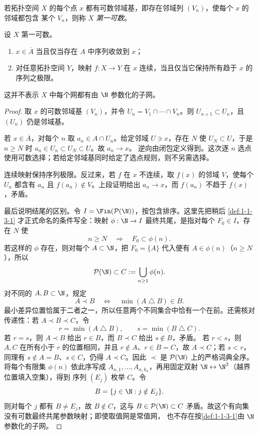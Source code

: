 \begin{definition}[第一可数]\label{def:1-1-1-first-countable}
若拓扑空间 \(X\) 的每个点 \(x\) 都有可数邻域基，即存在邻域列 \((V_n)\)，使每个 \(x\) 的邻域都包含
某个 \(V_n\)，则称 \(X\) \emph{第一可数}。
\end{definition}

\begin{proposition}[第一可数空间的序列检验]\label{proposition:1-1-1-first-countable-sequential-tests}
设 \(X\) 第一可数。
\begin{enumerate}
  \item \(x\in\overline A\) 当且仅当存在 \(A\) 中序列收敛到 \(x\)；
  \item 对任意拓扑空间 \(Y\)，映射 \(f:X\to Y\) 在 \(x\) 连续，当且仅当它保持所有趋于 \(x\) 的
  序列之极限。
\end{enumerate}
这并不表示 \(X\) 中每个网都有由 \(\N\) 参数化的子网。
\end{proposition}
\begin{proof}
取 \(x\) 的可数邻域基 \((V_n)\)，并令 \(U_n=V_1\cap\cdots\cap V_n\)。则
\(U_{n+1}\subset U_n\)，且 \((U_n)\) 仍是邻域基。

若 \(x\in\overline A\)，对每个 \(n\) 取 \(a_n\in A\cap U_n\)。给定邻域 \(U\ni x\)，存在 \(N\)
使 \(U_N\subset U\)，于是 \(n\ge N\) 时 \(a_n\in U_n\subset U_N\subset U\)。故 \(a_n\to x\)。
逆向由闭包定义得到。这次逐 \(n\) 选点使用可数选择；若给定邻域基同时给定了选点规则，则不另需选择。

连续映射保持序列极限。反过来，若 \(f\) 在 \(x\) 不连续，取 \(f(x)\) 的邻域 \(V\)，使每个 \(U_n\)
都含有 \(a_n\) 且 \(f(a_n)\notin V\)。上段证明给出 \(a_n\to x\)，而 \(f(a_n)\) 不趋于 \(f(x)\)，矛盾。

最后说明结尾的区别。令 \(I=\Fin(\mathcal P(\N))\)，按包含排序。这里先把稍后
\cref{def:1-1-3-1} 才正式命名的条件写全：映射 \(\phi:\N\to I\) 最终共尾，是指对每个
\(F_0\in I\)，存在 \(N\) 使
\[
  n\ge N\quad\Longrightarrow\quad F_0\subset\phi(n).
\]
若这样的 \(\phi\) 存在，则对每个 \(A\subset\N\)，把 \(F_0=\{A\}\) 代入便有
\(A\in\phi(n)\)（\(n\ge N\)），所以
\[
  \mathcal P(\N)\subset C:=\bigcup_{n\ge1}\phi(n).
\]
对不同的 \(A,B\subset\N\)，规定
\[
  A\prec B
  \quad\Longleftrightarrow\quad
  \min(A\mathbin\triangle B)\in B.
\]
最小差异位置恰属于二者之一，所以任意两个不同集合中恰有一个在前。还需核对传递性：若
\(A\prec B\prec C\)，令
\[
 r=\min(A\mathbin\triangle B),\qquad
 s=\min(B\mathbin\triangle C).
\]
若 \(r=s\)，则 \(A\prec B\) 给出 \(r\in B\)，而 \(B\prec C\) 给出 \(s\notin B\)，矛盾。
若 \(r<s\)，则 \(A,C\) 在所有小于 \(r\) 的位置相同，并且 \(r\notin A\)、\(r\in B=C\)，故
\(A\prec C\)；若 \(s<r\)，同理有 \(s\notin A=B\)、\(s\in C\)，仍得 \(A\prec C\)。因此
\(\prec\) 是 \(\mathcal P(\N)\) 上的严格词典全序。将每个有限集 \(\phi(n)\) 依此序写成
\(A_{n,1},\ldots,A_{n,k_n}\)，再用固定双射 \(\N\leftrightarrow\N^2\)（越界位置填入空集），得到
序列 \((E_j)\) 枚举 \(C\)。令
\[
  B=\{j\in\N:j\notin E_j\}.
\]
则对每个 \(j\) 都有 \(B\ne E_j\)，故 \(B\notin C\)，这与
\(B\in\mathcal P(\N)\subset C\) 矛盾。故这个有向集没有可数最终共尾参数映射；即使取值网是常值网，
也不存在按\cref{def:1-1-3-1}由 \(\N\) 参数化的子网。
\end{proof}

